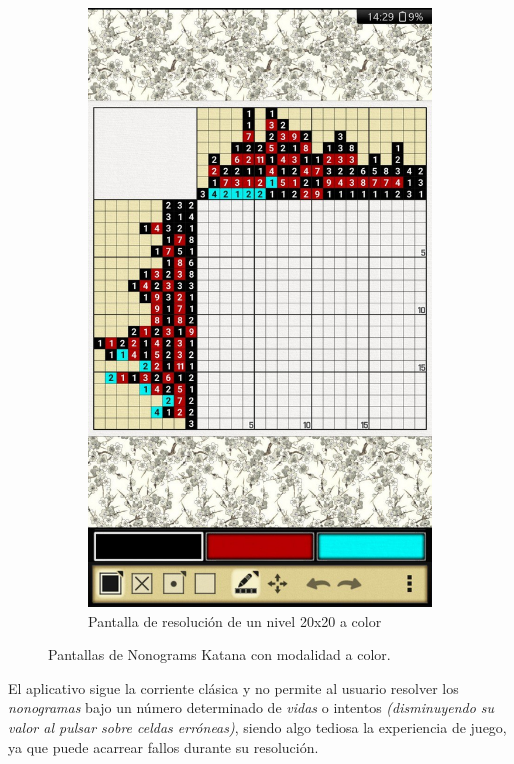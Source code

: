 \begin{figure}[H]
\begin{subfigure}[b]{0.47\linewidth}
     \includegraphics[width=\linewidth]{images/nonokatana3.jpg}
     \caption{Pantalla de resolución de un nivel 20x20 a color}
     \label{fig:katana2-2}
   \end{subfigure}
   \caption{Pantallas de Nonograms Katana con modalidad a color.}
   \label{fig:katana2}
 \end{figure}
 
 El aplicativo sigue la corriente clásica y no permite al usuario resolver los \textit{nonogramas} bajo un número determinado de \textit{vidas} 
 o intentos \textit{(disminuyendo su valor al pulsar sobre celdas erróneas)}, siendo algo tediosa la experiencia de juego, ya que puede acarrear fallos
 durante su resolución.

